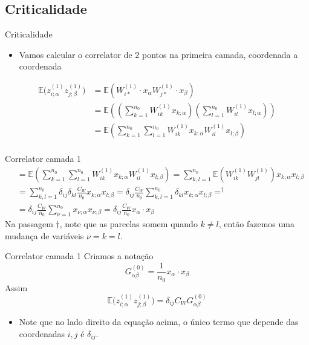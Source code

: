 \documentclass{beamer}
\newcommand{\EE}{\mathbb{E}}
\newcommand{\aaA}{\alpha}
\newcommand{\aaB}{\beta}
\begin{document}
\subsection{Criticalidade}
\begin{frame}{Criticalidade}
	\begin{itemize}
		\item Vamos calcular o correlator de 2 pontos na primeira camada, coordenada a coordenada
	\end{itemize}
		\begin{align*}
			\EE\big(z^{(1)}_{i;\aaA} z^{(1)}_{j;\aaB}\big) &= \EE\left(W^{(1)}_{i*}\cdot x_{\aaA}W^{(1)}_{j*}\cdot x_{\aaB} \right)\\
		&= \EE\left( \left(\sum_{k=1}^{n_0} W^{(1)}_{ik}x_{k;\aaA}\right)
		\left(\sum_{l=1}^{n_0} W^{(1)}_{il}x_{l;\aaA}\right) \right)\\
		&= \EE\left(\sum_{k=1}^{n_0}\sum_{l=1}^{n_0}W^{(1)}_{ik}x_{k;\aaA}W^{(1)}_{il}x_{l;\aaB} \right) \\
		\end{align*}
\end{frame}
\begin{frame}{Correlator camada 1}
	\begin{align*}
		&=\EE\left(\sum_{k=1}^{n_0}\sum_{l=1}^{n_0}W^{(1)}_{ik}x_{k;\aaA}W^{(1)}_{il}x_{l;\aaB} \right) = \sum_{k,l=1}^{n_0} \EE\left(W^{(1)}_{ik}W^{(1)}_{jl}\right) x_{k;\aaA}x_{l;\aaB} \\
		&= \sum_{k,l=1}^{n_0} \delta_{ij}\delta_{kl}\frac{C_W}{n_0} x_{k;\aaA}x_{l;\aaB} =\delta_{ij}\frac{C_W}{n_0} \sum_{k,l=1}^{n_0}\delta_{kl}x_{k;\aaA}x_{l;\aaB} =  ^{\dagger}\\
		&= \delta_{ij}\frac{C_W}{n_0} \sum_{\nu=1}^{n_0} x_{\nu;\aaA}x_{\nu;\aaB} =  \delta_{ij}\frac{C_W}{n_0}  x_{\aaA} \cdot x_{\aaB} \tag{3.8} \label{eq:corrcamada1}
	\end{align*}
	Na passagem $\dagger$, note que as parcelas somem quando $k\neq l$, então fazemos uma mudança de variáveis $\nu = k = l$.
\end{frame}

\begin{frame}{Correlator camada 1}
	Criamos a notação 
	\begin{equation*}\tag{3.9}\label{eq:G0}
		G_{\aaA\aaB}^{(0)} = \frac{1}{n_0} x_{\aaA}\cdot x_{\aaB}
	\end{equation*}
	Assim 
	\begin{equation*}\tag{3.10}\label{eq:correlator1G}
		\EE\big(z^{(1)}_{i;\aaA} z^{(1)}_{j;\aaB}\big) = \delta_{ij}C_WG_{\aaA\aaB}^{(0)}
	\end{equation*}
	\begin{itemize}
		\item Note que no lado direito da equação acima, o único termo que depende das coordenadas $i,j$ é $\delta_{ij}$.
\end{itemize}
\end{frame}
\end{document}

